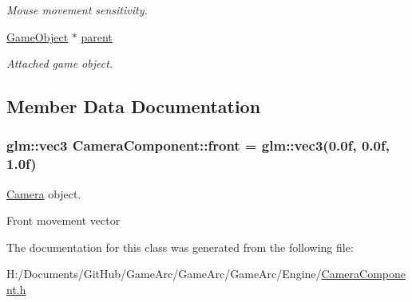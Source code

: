 \begin{DoxyCompactItemize}
\begin{DoxyCompactList}\small\item\em Mouse movement sensitivity. \end{DoxyCompactList}\item 
\hypertarget{class_camera_component_ae70994c6a86c59b0e6ab7482eb2cd403}{\hyperlink{class_game_object}{Game\+Object} $\ast$ \hyperlink{class_camera_component_ae70994c6a86c59b0e6ab7482eb2cd403}{parent}}\label{class_camera_component_ae70994c6a86c59b0e6ab7482eb2cd403}

\begin{DoxyCompactList}\small\item\em Attached game object. \end{DoxyCompactList}\end{DoxyCompactItemize}


\subsection{Member Data Documentation}
\hypertarget{class_camera_component_a3cc09f3e499de24e429ad2ad30b6ff43}{
\subsubsection[{front}]{\setlength{\rightskip}{0pt plus 5cm}glm\+::vec3 Camera\+Component\+::front = glm\+::vec3(0.\+0f, 0.\+0f, 1.\+0f)}}\label{class_camera_component_a3cc09f3e499de24e429ad2ad30b6ff43}


\hyperlink{class_camera}{Camera} object. 

Front movement vector 

The documentation for this class was generated from the following file\+:\begin{DoxyCompactItemize}
\item 
H\+:/\+Documents/\+Git\+Hub/\+Game\+Arc/\+Game\+Arc/\+Game\+Arc/\+Engine/\hyperlink{_camera_component_8h}{Camera\+Component.\+h}\end{DoxyCompactItemize}
